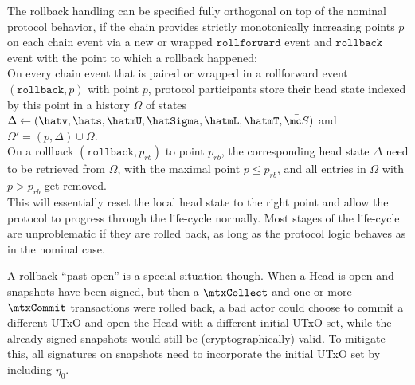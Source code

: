 The rollback handling can be specified fully orthogonal on top of the nominal
protocol behavior, if the chain provides strictly monotonically increasing
points $p$ on each chain event via a new or wrapped $\mathtt{rollforward}$
event and $\mathtt{rollback}$ event with the point to which a rollback happened:\\

\quad On every chain event that is paired or
wrapped in a rollforward event $(\mathtt{rollback},p)$ with point $p$, protocol
participants store their head state indexed by this point in a history
$\Omega$ of states $\Delta \gets (\hatv, \hats, \hatmU, \hatSigma, \hatmL, \hatmT, \bar{\mc S})$ and $\Omega' = (p, \Delta) \cup \Omega$. \\

\quad On a rollback
$(\mathtt{rollback},p_{rb})$ to point $p_{rb}$, the corresponding head state
$\Delta$ need to be retrieved from $\Omega$, with the maximal point
$p \leq p_{rb}$, and all entries in $\Omega$ with $p > p_{rb}$ get removed. \\

This will essentially reset the local head state to the right point and allow
the protocol to progress through the life-cycle normally. Most stages of the
life-cycle are unproblematic if they are rolled back, as long as the protocol
logic behaves as in the nominal case.

A rollback ``past open'' is a special situation though. When a Head is open and
snapshots have been signed, but then a $\mtxCollect$ and one or more
$\mtxCommit$ transactions were rolled back, a bad actor could choose to commit a
different UTxO and open the Head with a different initial UTxO set, while the
already signed snapshots would still be (cryptographically) valid. To mitigate
this, all signatures on snapshots need to incorporate the initial UTxO set by
including $\eta_{0}$. 





